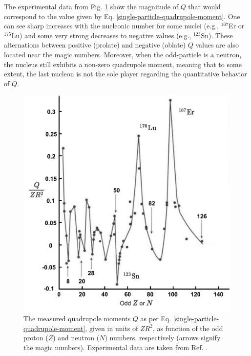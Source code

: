 The experimental data from Fig. \ref{experimental-Q-odd-nuclei} show the magnitude of $Q$ that would correspond to the value given by Eq. \eqref{single-particle-quadrupole-moment}. One can see sharp increases with the nucleonic number for some nuclei (e.g., $^{167}$Er or $^{175}$Lu) and some very strong decreases to negative values (e.g., $^{123}$Sn). These alternations between positive (prolate) and negative (oblate) $Q$ values are also located near the magic numbers. Moreover, when the odd-particle is a neutron, the nucleus still exhibits a non-zero quadrupole moment, meaning that to some extent, the last nucleon is not the sole player regarding the quantitative behavior of $Q$.
\begin{figure}
    \centering
    \includegraphics[scale=0.55]{Chapters/Figures/Exp_quadrupoleMoments.pdf}
    \caption{The measured quadrupole moments $Q$ as per Eq. \eqref{single-particle-quadrupole-moment}, given in units of $ZR^2$, as function of the odd proton ($Z$) and neutron ($N$) numbers, respectively (arrows signify the magic numbers). Experimental data are taken from Ref. \cite{bertulani2007nuclear}.}
    \label{experimental-Q-odd-nuclei}
\end{figure}

